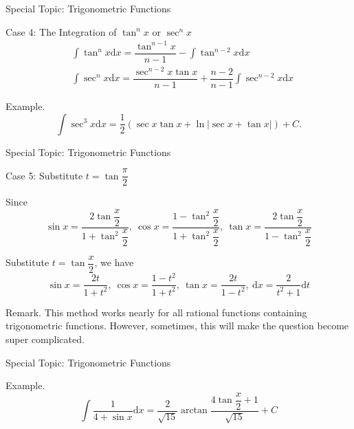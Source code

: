 \documentclass[aspectratio=169, UTF8]{ctexbeamer}
\begin{document}
    \begin{frame}[t]{Special Topic: Trigonometric Functions}
        \begin{block}{Case 4: The Integration of $\tan^nx$ or $\sec^nx$}
            \begin{equation*}\begin{aligned}
                & \int \tan ^{n} x \mathrm{d} x=\dfrac{\tan ^{n-1} x}{n-1}-\int \tan ^{n-2} x \mathrm{d} x \\
                & \int \sec ^{n} x \mathrm{d} x=\dfrac{\sec ^{n-2} x \tan x}{n-1}+\dfrac{n-2}{n-1} \int \sec ^{n-2} x \mathrm{d} x
            \end{aligned}\end{equation*}
        \end{block}
        
        \par \textcolor{yy}{Example.} $$\int \sec^3 x\mathrm{d}x = \dfrac{1}{2}\left(\sec x\tan x+\ln\left|\sec x+\tan x \right|\right)+C.$$
    \end{frame}

    \begin{frame}[t]{Special Topic: Trigonometric Functions}
        \begin{block}{Case 5: Substitute $t = \tan \dfrac{\pi}{2}$}
            \par Since  $$\sin x=\dfrac{2 \tan \dfrac{x}{2}}{1+\tan ^{2} \dfrac{x}{2}},\ \cos x=\dfrac{1-\tan ^{2} \dfrac{x}{2}}{1+\tan ^{2} \dfrac{x}{2}},\ \tan x=\dfrac{2 \tan \dfrac{x}{2}}{1-\tan ^{2} \dfrac{x}{2}}$$
            \par Substitute $t=\tan \dfrac{x}{2}$, we have $$\sin x=\dfrac{2 t}{1+t^2},\ \cos x=\dfrac{1-t^2}{1+t^2},\ \tan x=\dfrac{2 t}{1-t^2},\ \mathrm{d}x=\dfrac{2}{t^2+1}\mathrm{d}t$$
        \end{block}
        \par \textcolor{yy}{Remark.} This method works nearly for all rational functions containing trigonometric functions. {However}, sometimes, this will make the question become {super} {complicated}.
    \end{frame}
 
    \begin{frame}[t]{Special Topic: Trigonometric Functions}
        \par \textcolor{yy}{Example.} $$\int \dfrac{1}{4+\sin x} \mathrm{d} x =\dfrac{2}{\sqrt{15}} \arctan \dfrac{4 \tan \dfrac{x}{2}+1}{\sqrt{15}}+C$$
    \end{frame}
\end{document}

